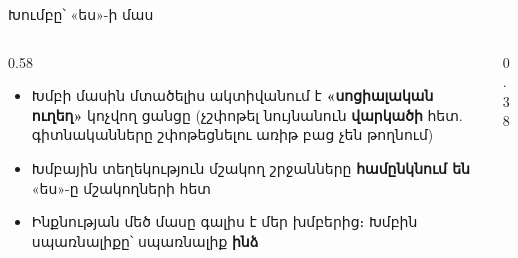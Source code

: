 \begin{frame}{Խումբը՝ «ես»-ի մաս}
  \begin{columns}[c]
    \begin{column}{0.58\textwidth}
      \begin{itemize}
        \item Խմբի մասին մտածելիս ակտիվանում է \textbf{«սոցիալական ուղեղ»} կոչվող ցանցը {\small (չշփոթել նույնանուն \textbf{վարկածի} հետ. գիտնականները շփոթեցնելու առիթ բաց չեն թողնում)}
        \item<2-> Խմբային տեղեկություն մշակող շրջանները \textbf{համընկնում են} «ես»-ը մշակողների հետ
        \item<3-> Ինքնության մեծ մասը գալիս է մեր խմբերից։ Խմբին սպառնալիքը՝ սպառնալիք \textbf{ինձ}
      \end{itemize}
    \end{column}
    \begin{column}{0.38\textwidth}
      \centering
    \end{column}
  \end{columns}
\end{frame}

